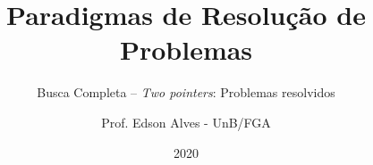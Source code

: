 \title{Paradigmas de Resolução de Problemas}
\subtitle{Busca Completa -- {\it Two pointers}: Problemas resolvidos}
\author{Prof. Edson Alves - UnB/FGA}
\date{2020}
